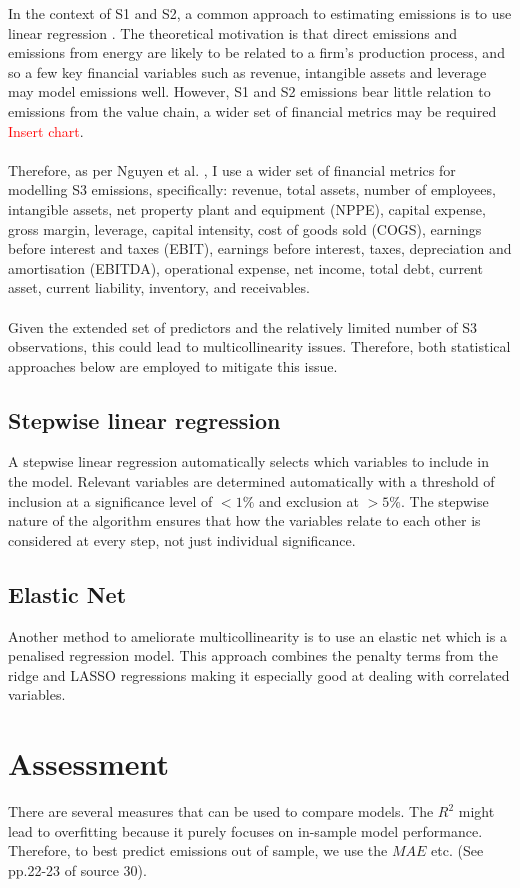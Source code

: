 \documentclass[12pt,twoside]{report}
\begin{document}
In the context of S1 and S2, a common approach to estimating emissions is to use linear regression \cite{GoldhammerEtAl2017, Griffin2017}. The theoretical motivation is that direct emissions and emissions from energy are likely to be related to a firm's production process, and so a few key financial variables such as revenue, intangible assets and leverage may model emissions well. However, S1 and S2 emissions bear little relation to emissions from the value chain, a wider set of financial metrics may be required \textcolor{red}{Insert chart}. 
\\\\
Therefore, as per Nguyen et al. \cite{Nguyenetal2023}, I use a wider set of financial metrics for modelling S3 emissions, specifically: revenue, total assets, number of employees, intangible assets, net property plant and equipment (NPPE), capital expense, gross margin, leverage, capital intensity, cost of goods sold (COGS), earnings before interest and taxes (EBIT), earnings before interest, taxes, depreciation and amortisation (EBITDA), operational expense, net income, total debt, current asset, current liability, inventory, and receivables. 
\\\\
Given the extended set of predictors and the relatively limited number of S3 observations, this could lead to multicollinearity issues. Therefore, both statistical approaches below are employed to mitigate this issue.

\subsection{Stepwise linear regression}

A stepwise linear regression automatically selects which variables to include in the model. Relevant variables are determined automatically with a threshold of inclusion at a significance level of $<1\%$ and exclusion at $>5\%$. The stepwise nature of the algorithm ensures that how the variables relate to each other is considered at every step, not just individual significance. 

\subsection{Elastic Net}

Another method to ameliorate multicollinearity is to use an elastic net which is a penalised regression model. This approach combines the penalty terms from the ridge and LASSO regressions making it especially good at dealing with correlated variables. 

\section{Assessment}

There are several measures that can be used to compare models. The $R^{2}$ might lead to overfitting because it purely focuses on in-sample model performance. Therefore, to best predict emissions out of sample, we use the $MAE$ etc. (See pp.22-23 of source 30).





\end{document}
